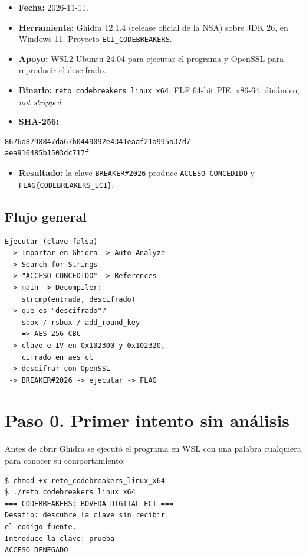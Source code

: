 \documentclass[journal]{IEEEtran}
\begin{document}
\begin{itemize}
  \item \textbf{Fecha:} 2026-11-11.
  \item \textbf{Herramienta:} Ghidra 12.1.4 (release oficial de la NSA) sobre
        JDK 26, en Windows 11. Proyecto \texttt{ECI\_\allowbreak{}CODEBREAKERS}.
  \item \textbf{Apoyo:} WSL2 Ubuntu 24.04 para ejecutar el programa y OpenSSL
        para reproducir el descifrado.
  \item \textbf{Binario:} \texttt{reto\_\allowbreak{}codebreakers\_\allowbreak{}linux\_\allowbreak{}x64}, ELF 64-bit PIE,
        x86-64, din\'amico, \textit{not stripped}.
  \item \textbf{SHA-256:}
\end{itemize}
{\scriptsize\begin{verbatim}
8676a8798847da67b0449092e4341eaaf21a995a37d7
aea916485b1503dc717f
\end{verbatim}}
\begin{itemize}
  \item \textbf{Resultado:} la clave \texttt{BREAKER\#2026} produce
        \texttt{ACCESO CONCEDIDO} y \texttt{FLAG\{CODEBREAKERS\_\allowbreak{}ECI\}}.
\end{itemize}

\subsection{Flujo general}

{\scriptsize\begin{verbatim}
Ejecutar (clave falsa)
 -> Importar en Ghidra -> Auto Analyze
 -> Search for Strings
 -> "ACCESO CONCEDIDO" -> References
 -> main -> Decompiler:
    strcmp(entrada, descifrado)
 -> que es "descifrado"?
    sbox / rsbox / add_round_key
    => AES-256-CBC
 -> clave e IV en 0x102300 y 0x102320,
    cifrado en aes_ct
 -> descifrar con OpenSSL
 -> BREAKER#2026 -> ejecutar -> FLAG
\end{verbatim}}

\section{Paso 0. Primer intento sin an\'alisis}

Antes de abrir Ghidra se ejecut\'o el programa en WSL con una palabra cualquiera
para conocer su comportamiento:

{\scriptsize\begin{verbatim}
$ chmod +x reto_codebreakers_linux_x64
$ ./reto_codebreakers_linux_x64
=== CODEBREAKERS: BOVEDA DIGITAL ECI ===
Desafio: descubre la clave sin recibir
el codigo fuente.
Introduce la clave: prueba
ACCESO DENEGADO
\end{verbatim}}
\end{document}
